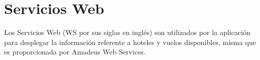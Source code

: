 \section{Servicios Web}
Los Servicios Web (WS por sus siglas en inglés) son utilizados por la aplicación para desplegar la información referente a 
hoteles y vuelos disponibles, misma que es proporcionada por Amadeus Web Services.